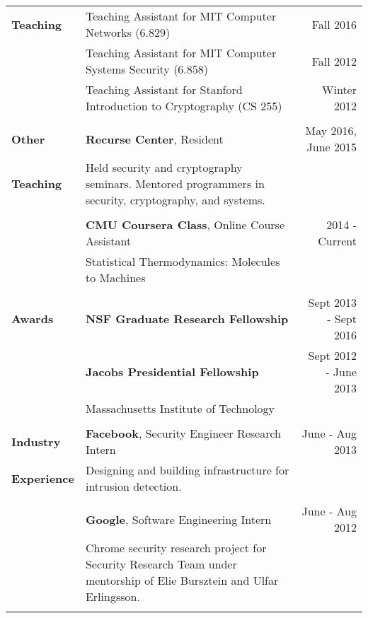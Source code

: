 \documentclass[a4paper,10pt]{article}
\begin{document}
\begin{longtable}{ p{0.9in} l @{\extracolsep{\fill}} r}
\textbf{Teaching} 
& Teaching Assistant for MIT Computer Networks (6.829) & Fall 2016 \\
& Teaching Assistant for MIT Computer Systems Security (6.858) & Fall 2012 \\
& Teaching Assistant for Stanford Introduction to Cryptography (CS 255) & Winter 2012 \\ \\

\textbf{Other} & \textbf{Recurse Center}, Resident & May 2016, June 2015 \\ 
\textbf{Teaching} & \begin{minipage}[t]{0.5 \textwidth} 
Held security and cryptography seminars. Mentored programmers 
in security, cryptography, and systems. 
\end{minipage} \\ \\

 & \textbf{CMU Coursera Class}, Online Course Assistant & 2014 - Current\\
 & Statistical Thermodynamics: Molecules to Machines & \\ \\

\textbf{Awards} & \textbf{NSF Graduate Research Fellowship} & Sept 2013 - Sept 2016\\
& \textbf{Jacobs Presidential Fellowship} & Sept 2012 - June 2013\\
& Massachusetts Institute of Technology \\
\\

\textbf{Industry}  & \textbf{Facebook}, Security Engineer Research Intern & June - Aug 2013 \\
\textbf{Experience} & \begin{minipage}[t]{0.5 \textwidth} 
Designing and building infrastructure for intrusion detection.
\end{minipage}
& \\ \\
& \textbf{Google}, Software Engineering Intern & June - Aug 2012 \\
& \begin{minipage}[t]{0.5 \textwidth} 
Chrome security research project for Security Research Team under mentorship of Elie Bursztein and Ulfar Erlingsson.
\end{minipage}
& \\ \\


\end{longtable}
\end{document}
